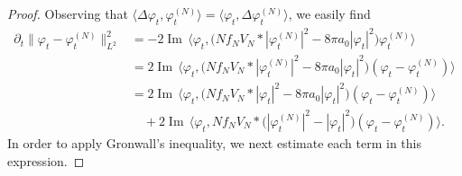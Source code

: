 \documentclass[11pt,a4paper,draft,DIV11]{scrartcl}	%
\renewcommand{\Im}{\operatorname{Im}\,} 	%
\begin{document}
\begin{proof}
  Observing that $\langle \Delta \varphi_t, \varphi_t^{(N)} \rangle = \langle
  \varphi_t, \Delta \varphi_t^{(N)} \rangle$, we easily find
  \begin{equation}\label{ddt}
    \begin{aligned}
      \partial_t \| \varphi_t - \varphi_t^{(N)} \|_{L^2}^2 & = -2 \Im \langle
      \varphi_t, \big(N f_N V_N * |\varphi_t^{(N)}|^2 - 8 \pi a_0 |\varphi_t|^2\big)
      \varphi_t^{(N)} \rangle \\
      & = 2 \Im \langle \varphi_t, \big(N f_N V_N * |\varphi_t^{(N)}|^2 - 8 \pi
      a_0 |\varphi_t|^2\big) (\varphi_t - \varphi_t^{(N)}) \rangle \\
      & = 2 \Im \langle \varphi_t, \big(N f_N V_N * |\varphi_t|^2 - 8 \pi a_0
      |\varphi_t|^2\big) (\varphi_t - \varphi_t^{(N)}) \rangle \\
      & \quad + 2 \Im \langle \varphi_t, N f_N V_N * \big(|\varphi_t^{(N)}|^2 -
      |\varphi_t|^2\big) (\varphi_t - \varphi_t^{(N)}) \rangle.
    \end{aligned}
  \end{equation}
  In order to apply Gronwall's inequality, we next estimate each term in this
  expression.



\end{proof}
\end{document}
